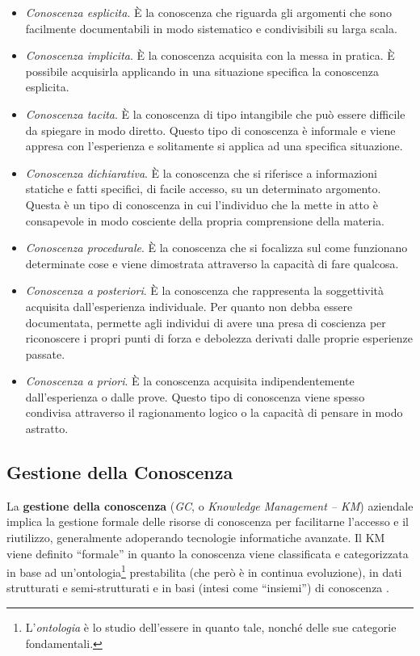 \begin{itemize}
    \item \textit{Conoscenza esplicita}. È la conoscenza che riguarda gli argomenti che sono facilmente documentabili in modo sistematico e condivisibili su larga scala.
    \item \textit{Conoscenza implicita}. È la conoscenza acquisita con la messa in pratica. È possibile acquisirla applicando in una situazione specifica la conoscenza esplicita.
    \item \textit{Conoscenza tacita}. È la conoscenza di tipo intangibile che può essere difficile da spiegare in modo diretto. Questo tipo di conoscenza è informale e viene appresa con l’esperienza e solitamente si applica ad una specifica situazione. 
    \item \textit{Conoscenza dichiarativa}. È la conoscenza che si riferisce a informazioni statiche e fatti specifici, di facile accesso, su un determinato argomento. Questa è un tipo di conoscenza in cui l’individuo che la mette in atto è consapevole in modo cosciente della propria comprensione della materia.
    \item \textit{Conoscenza procedurale}. È la conoscenza che si focalizza sul come funzionano determinate cose e viene dimostrata attraverso la capacità di fare qualcosa.
    \item \textit{Conoscenza a posteriori}. È la conoscenza che rappresenta la soggettività acquisita dall'esperienza individuale. Per quanto non debba essere documentata, permette agli individui di avere una presa di coscienza per riconoscere i propri punti di forza e debolezza derivati dalle proprie esperienze passate.
    \item \textit{Conoscenza a priori}. È la conoscenza acquisita indipendentemente dall'esperienza o dalle prove. Questo tipo di conoscenza viene spesso condivisa attraverso il ragionamento logico o la capacità di pensare in modo astratto.
\end{itemize}

\subsection{Gestione della Conoscenza}

La \textbf{gestione della conoscenza} (\textit{GC}, o \textit{Knowledge Management – KM}) aziendale implica la gestione formale delle risorse di conoscenza per facilitarne l'accesso e il riutilizzo, generalmente adoperando tecnologie informatiche avanzate. Il KM viene definito ``formale'' in quanto la conoscenza viene classificata e categorizzata in base ad un'ontologia\footnote{L'\textit{ontologia} è lo studio dell'essere in quanto tale, nonché delle sue categorie fondamentali.} prestabilita (che però è in continua evoluzione), in dati strutturati e semi-strutturati e in basi (intesi come ``insiemi'') di conoscenza \cite{overview_of_knowledge_management}.

